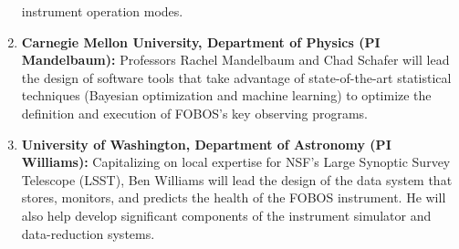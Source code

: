 \documentclass[oneside,11pt]{amsart}
\begin{document}
\begin{enumerate}
instrument operation modes.
%
\item {\bf Carnegie Mellon University, Department of Physics (PI
Mandelbaum):} Professors Rachel Mandelbaum and Chad Schafer will lead
the design of software tools that take advantage of state-of-the-art
statistical techniques (Bayesian optimization and machine learning) to
optimize the definition and execution of FOBOS's key observing programs.
%
\item {\bf University of Washington, Department of Astronomy (PI
Williams):} Capitalizing on local expertise for NSF's Large Synoptic
Survey Telescope (LSST), Ben Williams will lead the design of the data
system that stores, monitors, and predicts the health of the FOBOS
instrument. He will also help develop significant components of the
instrument simulator and data-reduction systems.
%
\end{enumerate}

\end{document}
